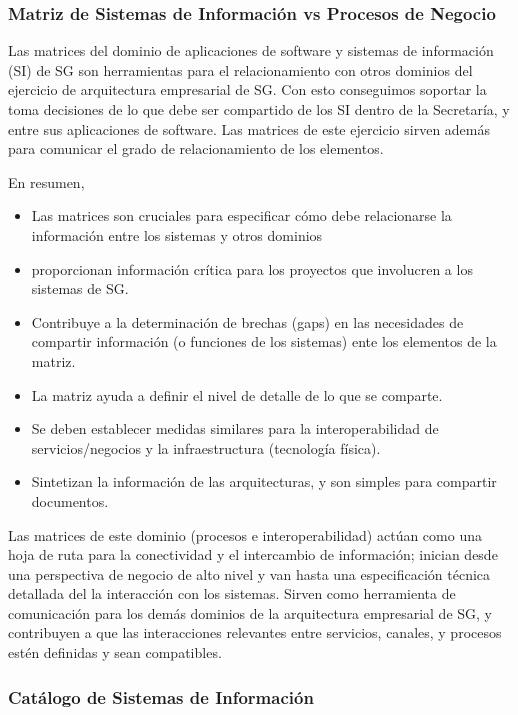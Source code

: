 \documentclass[
	a4paper, %
	12pt, %
]{include/CSSullivanBusinessReport}
\def\tightlist{}
\begin{document}
\subsubsection{Matriz de Sistemas de Información vs Procesos de
Negocio}\label{sec:matriz-de-sistemas-de-informaciuxf3n-vs-procesos-de-negocio}

Las matrices del dominio de aplicaciones de software y sistemas de
información (SI) de SG son herramientas para el relacionamiento con
otros dominios del ejercicio de arquitectura empresarial de SG. Con esto
conseguimos soportar la toma decisiones de lo que debe ser compartido de
los SI dentro de la Secretaría, y entre sus aplicaciones de software.
Las matrices de este ejercicio sirven además para comunicar el grado de
relacionamiento de los elementos.

En resumen,

\begin{itemize}
\tightlist
\item
  Las matrices son cruciales para especificar cómo debe relacionarse la
  información entre los sistemas y otros dominios
\item
  proporcionan información crítica para los proyectos que involucren a
  los sistemas de SG.
\item
  Contribuye a la determinación de brechas (gaps) en las necesidades de
  compartir información (o funciones de los sistemas) ente los elementos
  de la matriz.
\item
  La matriz ayuda a definir el nivel de detalle de lo que se comparte.
\item
  Se deben establecer medidas similares para la interoperabilidad de
  servicios/negocios y la infraestructura (tecnología física).
\item
  Sintetizan la información de las arquitecturas, y son simples para
  compartir documentos.
\end{itemize}

Las matrices de este dominio (procesos e interoperabilidad) actúan como
una hoja de ruta para la conectividad y el intercambio de información;
inician desde una perspectiva de negocio de alto nivel y van hasta una
especificación técnica detallada del la interacción con los sistemas.
Sirven como herramienta de comunicación para los demás dominios de la
arquitectura empresarial de SG, y contribuyen a que las interacciones
relevantes entre servicios, canales, y procesos estén definidas y sean
compatibles.

\subsubsection{Catálogo de Sistemas de
Información}\label{sec:catuxe1logo-de-sistemas-de-informaciuxf3n}
\end{document}
